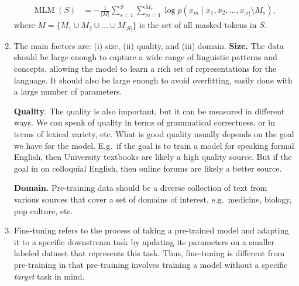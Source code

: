 \documentclass[11pt,a4paper]{article}
\newcommand\op[1]{\operatorname{#1}}
\begin{document}
\begin{enumerate}[label=(\alph*)]
\begin{align}
          \end{align}
          \begin{align}
              \op{MLM}(S) & = - \frac{1}{|M|} \sum_{s=1}^{S} \sum_{m=1}^{M_s} \log p(x_m \mid x_1, x_2, \ldots, x_{|s|} \setminus M_s),
          \end{align}
          where $M = \{M_1 \cup M_2 \cup \ldots \cup M_{|S|}\}$ is the set of 
          all masked tokens in $S$.
    \item The main factors are: (i) size, (ii) quality, and (iii) domain.
          \textbf{Size.} The data should be large enough to capture a wide range
          of linguistic patterns and concepts, allowing the model to learn a
          rich set of representations for the language.
          It should also be large enough to avoid overfitting, easily done with
          a large number of parameters.

          \textbf{Quality}. The quality is also important, but it can be
          measured in different ways.
          We can speak of quality in terms of grammatical correctness, or in
          terms of lexical variety, etc.
          What is good quality usually depends on the goal we have for the
          model.
          E.g.\ if the goal is to train a model for speaking formal English,
          then University textbooks are likely a high quality source.
          But if the goal in on colloquial English, then online forums are
          likely a better source.

          \textbf{Domain.} Pre-training data should be a diverse collection of
          text from various sources that cover a set of domains of interest,
          e.g.\ medicine, biology, pop culture, etc.
    \item Fine-tuning refers to the process of taking a pre-trained model and
          adapting it to a specific downstream task by updating its parameters
          on a smaller labeled dataset that represents this task.
          Thus, fine-tuning is different from pre-training in that pre-training
          involves training a model without a specific \emph{target} task
          in mind.


\end{enumerate}
\end{document}
